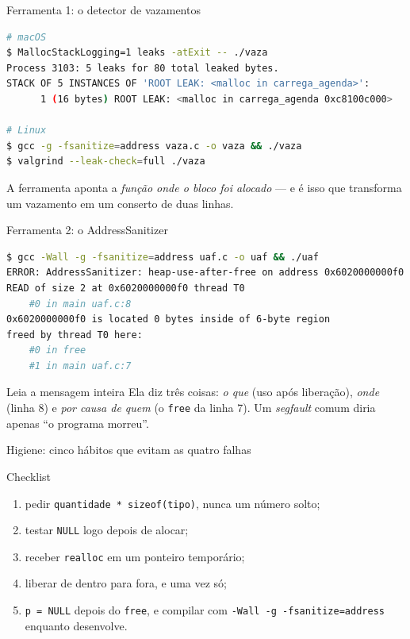 \documentclass[aspectratio=169]{beamer}
\begin{document}
\begin{frame}[fragile]{Ferramenta 1: o detector de vazamentos}
\begin{lstlisting}[basicstyle=\ttfamily\scriptsize, numbers=none, language=bash]
# macOS
$ MallocStackLogging=1 leaks -atExit -- ./vaza
Process 3103: 5 leaks for 80 total leaked bytes.
STACK OF 5 INSTANCES OF 'ROOT LEAK: <malloc in carrega_agenda>':
      1 (16 bytes) ROOT LEAK: <malloc in carrega_agenda 0xc8100c000>

# Linux
$ gcc -g -fsanitize=address vaza.c -o vaza && ./vaza
$ valgrind --leak-check=full ./vaza
\end{lstlisting}
  \begin{center}\small
  A ferramenta aponta a \emph{função onde o bloco foi alocado} --- e é isso que
  transforma um vazamento em um conserto de duas linhas.
  \end{center}
\end{frame}

\begin{frame}[fragile]{Ferramenta 2: o AddressSanitizer}
\begin{lstlisting}[basicstyle=\ttfamily\scriptsize, numbers=none, language=bash]
$ gcc -Wall -g -fsanitize=address uaf.c -o uaf && ./uaf
ERROR: AddressSanitizer: heap-use-after-free on address 0x6020000000f0
READ of size 2 at 0x6020000000f0 thread T0
    #0 in main uaf.c:8
0x6020000000f0 is located 0 bytes inside of 6-byte region
freed by thread T0 here:
    #0 in free
    #1 in main uaf.c:7
\end{lstlisting}
  \begin{block}{Leia a mensagem inteira}
    Ela diz três coisas: \emph{o que} (uso após liberação), \emph{onde} (linha
    8) e \emph{por causa de quem} (o \texttt{free} da linha 7). Um
    \emph{segfault} comum diria apenas ``o programa morreu''.
  \end{block}
\end{frame}

\begin{frame}{Higiene: cinco hábitos que evitam as quatro falhas}
  \begin{block}{Checklist}
    \begin{enumerate}
      \item pedir \texttt{quantidade * sizeof(tipo)}, nunca um número solto;
      \item testar \texttt{NULL} logo depois de alocar;
      \item receber \texttt{realloc} em um ponteiro temporário;
      \item liberar de dentro para fora, e uma vez só;
      \item \texttt{p = NULL} depois do \texttt{free}, e compilar com
        \texttt{-Wall -g -fsanitize=address} enquanto desenvolve.
    \end{enumerate}
  \end{block}
\end{frame}
\end{document}
